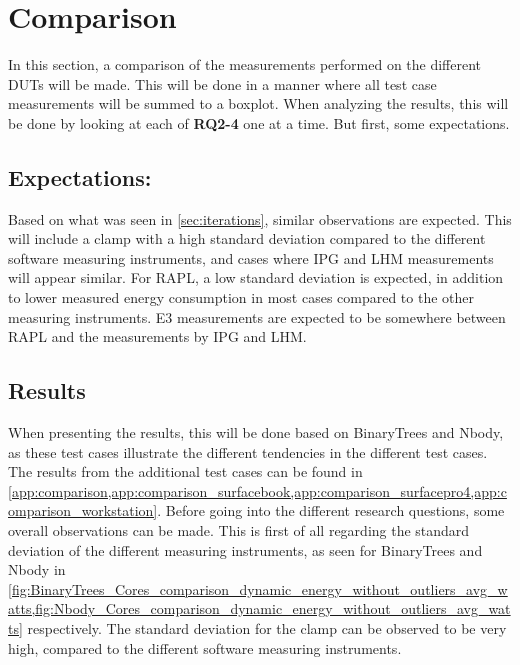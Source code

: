 \section{Comparison}\label{sec:comparison}

In this section, a comparison of the measurements performed on the different DUTs will be made. This will be done in a manner where all test case measurements will be summed to a boxplot. When analyzing the results, this will be done by looking at each of \textbf{RQ2-4} one at a time. But first, some expectations.


\subsection{Expectations:} 

Based on what was seen in \cref{sec:iterations}, similar observations are expected. This will include a clamp with a high standard deviation compared to the different software measuring instruments, and cases where IPG and LHM measurements will appear similar. For RAPL, a low standard deviation is expected, in addition to lower measured energy consumption in most cases compared to the other measuring instruments. E3 measurements are expected to be somewhere between RAPL and the measurements by IPG and LHM.


\subsection{Results}

When presenting the results, this will be done based on BinaryTrees and Nbody, as these test cases illustrate the different tendencies in the different test cases. The results from the additional test cases can be found in \cref*{app:comparison,app:comparison_surfacebook,app:comparison_surfacepro4,app:comparison_workstation}. Before going into the different research questions, some overall observations can be made. This is first of all regarding the standard deviation of the different measuring instruments, as seen for BinaryTrees and Nbody in \cref*{fig:BinaryTrees_Cores_comparison_dynamic_energy_without_outliers_avg_watts,fig:Nbody_Cores_comparison_dynamic_energy_without_outliers_avg_watts} respectively. The standard deviation for the clamp can be observed to be very high, compared to the different software measuring instruments.






